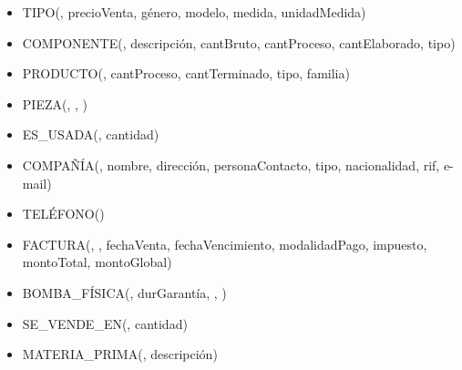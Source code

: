 \documentclass[]{report}
\begin{document}
	\begin{itemize}
	\item TIPO(, precioVenta, género, modelo, medida, unidadMedida) \par 
	\item COMPONENTE(, descripción, cantBruto, cantProceso, cantElaborado, tipo) \par 
	\item PRODUCTO(, cantProceso, cantTerminado, tipo, familia) \par
	\item PIEZA(, , ) \par
	\item ES\_USADA(, cantidad) \par\vspace{0,2cm}
	\item COMPAÑÍA(, nombre, dirección, personaContacto, tipo, nacionalidad, rif, e-mail) \par
	\item TELÉFONO() \par
	\item FACTURA(, , fechaVenta, fechaVencimiento, modalidadPago, impuesto, \\ montoTotal, montoGlobal) \par
	\item BOMBA\_FÍSICA(, durGarantía, , ) \par
	\item SE\_VENDE\_EN(, cantidad) \par \vspace{0.2cm}
	
	\item MATERIA\_PRIMA(, descripción)\par
	

\end{itemize}
\end{document}
